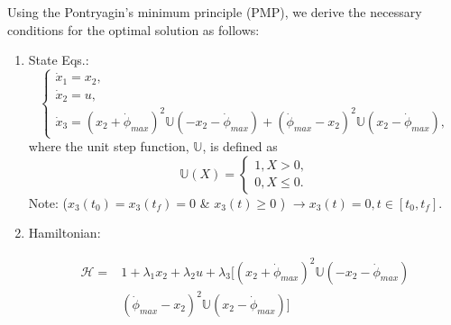 \documentclass[letterpaper, preprint, paper,11pt]{AAS}	%
\begin{document}
			Using the Pontryagin's minimum principle (PMP), we derive the necessary conditions for the optimal solution as follows:
			\begin{enumerate}
				\item State Eqs.:
				\begin{equation}
					\left\{
					\begin{array}{l}
					\dot{x}_1=x_2, \\
					\dot{x}_2=u, \\
					\dot{x}_3=(x_2+\dot{\phi}_{max})^2\mathbb{U}(-x_2-\dot{\phi}_{max})+(\dot{\phi}_{max}-x_2)^2\mathbb{U}(x_2-\dot{\phi}_{max}),
					\end{array}
					\right.
				\end{equation}
				where the unit step function, $\mathbb{U}$, is defined as
				\begin{equation}
					\mathbb{U}(X)=\left\{
					\begin{array}{l}
					1,   X>0, \\
					0,   X\leq 0.
					\end{array}
					\right.
				\end{equation}
				Note:  ($x_3(t_0)=x_3(t_f)=0$ \& $x_3(t)\geq 0$ ) $\rightarrow x_3(t)=0, t\in[t_0, t_f]$. 
				
				\item Hamiltonian:
				
				\begin{equation}
					\begin{split}
					\mathscr{H}=& 1+\lambda_1x_2+\lambda_2u+\lambda_3\Big[(x_2+\dot{\phi}_{max})^2\mathbb{U}(-x_2-\dot{\phi}_{max})\\
				    	& (\dot{\phi}_{max}-x_2)^2\mathbb{U}(x_2-\dot{\phi}_{max})\Big]
					\end{split}
				\end{equation}

			

\end{enumerate}
\end{document}
